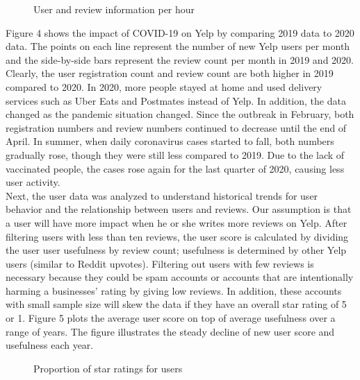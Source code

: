 \documentclass[11pt,journal,compsoc]{IEEEtran}
\begin{document}
\begin{figure*}[!t]
\centering
{}
\caption{User and review information per hour}
\label{fig_sim}
\end{figure*}
\indent Figure 4 shows the impact of COVID-19 on Yelp by comparing 2019 data to 2020 data. The points on each line represent the number of new Yelp users per month and the side-by-side bars represent the review count per month in 2019 and 2020. Clearly, the user registration count and review count are both higher in 2019 compared to 2020. In 2020, more people stayed at home and used delivery services such as Uber Eats and Postmates instead of Yelp. In addition, the data changed as the pandemic situation changed. Since the outbreak in February, both registration numbers and review numbers continued to decrease until the end of April. In summer, when daily coronavirus cases started to fall, both numbers gradually rose, though they were still less compared to 2019. Due to the lack of vaccinated people, the cases rose again for the last quarter of 2020, causing less user activity. \\
\indent Next, the user data was analyzed to understand historical trends for user behavior and the relationship between users and reviews. Our assumption is that a user will have more impact when he or she writes more reviews on Yelp. After filtering users with less than ten reviews, the user score is calculated by dividing the user user usefulness by review count; usefulness is determined by other Yelp users (similar to Reddit upvotes). Filtering out users with few reviews is necessary because they could be spam accounts or accounts that are intentionally harming a businesses’ rating by giving low reviews. In addition, these accounts with small sample size will skew the data if they have an overall star rating of 5 or 1. Figure 5 plots the average user score on top of average usefulness over a range of years. The figure illustrates the steady decline of new user score and usefulness each year.  \\
\begin{figure*}[!t]
\centering
{}
\hfil
{}
\caption{Proportion of star ratings for users}
\label{fig_sim}
\end{figure*}
\end{document}
